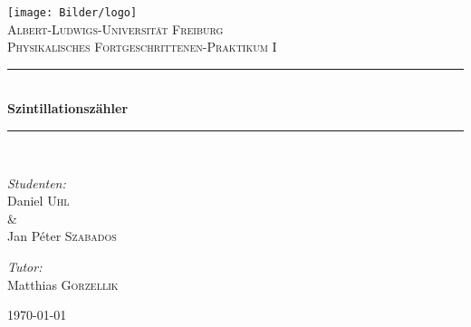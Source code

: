 
\begin{titlepage}

\begin{center}



\texttt{[image: Bilder/logo]}\\[1.2cm]    

\textsc{\LARGE Albert-Ludwigs-Universit\"at Freiburg}\\[1.75cm]

\textsc{\Large Physikalisches Fortgeschrittenen-Praktikum I}\\[0.75cm]



\newcommand{\HRule}{\rule{\linewidth}{0.5mm}}
\HRule \\[0.5cm]
{ \huge \bfseries Szintillationszähler}\\[0.5cm]

\HRule \\[1.75cm]


\begin{minipage}{0.4\textwidth}
\begin{flushleft} \large
\emph{Studenten:}\\
Daniel \textsc{Uhl}\\ \setlength{\parindent}{1.25cm} \& 
\setlength{\parindent}{0cm} \\ Jan P\'eter \textsc{Szabados} 
\end{flushleft}
\end{minipage}
\hfill
\begin{minipage}{0.4\textwidth}
\begin{flushright} \large
\emph{Tutor:} \\
Matthias \textsc{Gorzellik}\\
\end{flushright}
\end{minipage}

\vfill


{\large \today}

\end{center}

\end{titlepage}